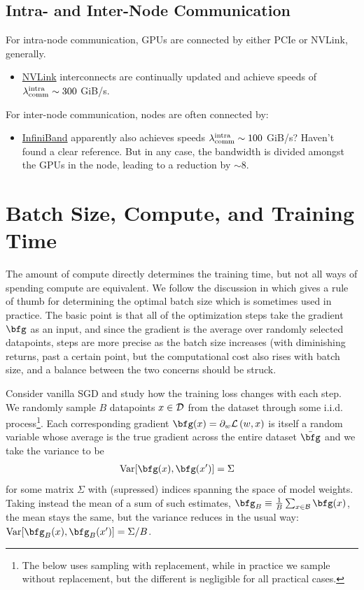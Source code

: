 \documentclass[11pt]{article}
\begin{document}
\subsection{Intra- and Inter-Node Communication}

For intra-node communication, GPUs are connected by either PCIe or NVLink, generally.
\begin{itemize}
	\item \href{https://blogs.nvidia.com/blog/2023/03/06/what-is-nvidia-nvlink/}{NVLink}
	      interconnects are continually updated and achieve speeds of $ \lambda _{ {\rm comm} } ^{
			      {\rm intra} } \sim 300$ GiB/s.
\end{itemize}


For inter-node communication, nodes are often connected by:
\begin{itemize}
	\item \href{https://en.wikipedia.org/wiki/InfiniBand}{InfiniBand} apparently also achieves speeds $ \lambda _{ {\rm comm} } ^{
			      {\rm intra} } \sim 100$ GiB/s?  Haven't found a clear reference. But in any case, the
	      bandwidth is divided amongst the GPUs in the node, leading to a reduction by $ \sim 8 $.
\end{itemize}

\section{Batch Size, Compute, and Training Time \label{app_batch_size}}

The amount of compute directly determines the training time, but not all ways of spending compute
are equivalent. We follow the discussion in \cite{mccandlish2018empirical} which gives a rule of thumb
for determining the optimal batch size which is sometimes used in practice. The basic point is that
all of the optimization steps take the gradient $ \bfg  $ as an input, and since the gradient is the
average over randomly selected datapoints, steps are more precise as the batch size increases (with
diminishing returns, past a certain point, but the computational cost also rises with batch size,
and a balance between the two concerns should be struck.

Consider vanilla SGD and study how the training loss changes with each step.  We randomly sample $ B
$ datapoints $ x \in \mathcal{D}$ from the dataset through some i.i.d. process\footnote{The below uses
	sampling with replacement, while in practice we sample without replacement, but the different is
	negligible for all practical cases.}. Each corresponding gradient $ \bfg (x) = \partial _{ w} \Lcal
	\left ( w, x \right ) $ is itself a random variable whose average is the true gradient across the
entire dataset $ \bar{\bfg} $ and we take the variance to be
\begin{align}
	{\rm Var}[\bfg (x), \bfg (x')] & =\Sigma
\end{align}
for some matrix $ \Sigma  $ with (supressed) indices spanning the space of model weights. Taking instead the mean
of a sum of such estimates, $ \bfg _{ B }\equiv \frac{ 1 }{ B } \sum _{ x \in \Bcal} \bfg (x) $,
the mean stays the same, but the variance reduces in the usual way: $ {\rm Var}[\bfg _{ B } (x),
			\bfg _{ B }(x')]=\Sigma /B$.
\end{document}
